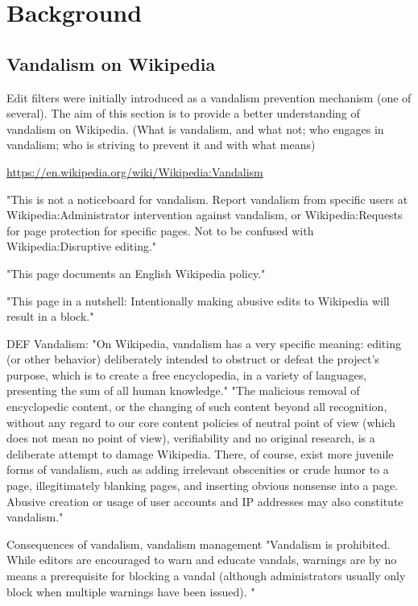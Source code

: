 \chapter{Background}
\label{chap:background}

\section{Vandalism on Wikipedia}

Edit filters were initially introduced as a vandalism prevention mechanism (one of several).
The aim of this section is to provide a better understanding of vandalism on Wikipedia. (What is vandalism, and what not; who engages in vandalism; who is striving to prevent it and with what means)

\url{https://en.wikipedia.org/wiki/Wikipedia:Vandalism}

"This is not a noticeboard for vandalism. Report vandalism from specific users at Wikipedia:Administrator intervention against vandalism, or Wikipedia:Requests for page protection for specific pages.
Not to be confused with Wikipedia:Disruptive editing."

"This page documents an English Wikipedia policy."

"This page in a nutshell: Intentionally making abusive edits to Wikipedia will result in a block."

DEF Vandalism:
"On Wikipedia, vandalism has a very specific meaning: editing (or other behavior) deliberately intended to obstruct or defeat the project's purpose, which is to create a free encyclopedia, in a variety of languages, presenting the sum of all human knowledge."
"The malicious removal of encyclopedic content, or the changing of such content beyond all recognition, without any regard to our core content policies of neutral point of view (which does not mean no point of view), verifiability and no original research, is a deliberate attempt to damage Wikipedia. There, of course, exist more juvenile forms of vandalism, such as adding irrelevant obscenities or crude humor to a page, illegitimately blanking pages, and inserting obvious nonsense into a page. Abusive creation or usage of user accounts and IP addresses may also constitute vandalism."

Consequences of vandalism, vandalism management
"Vandalism is prohibited. While editors are encouraged to warn and educate vandals, warnings are by no means a prerequisite for blocking a vandal (although administrators usually only block when multiple warnings have been issued). "

